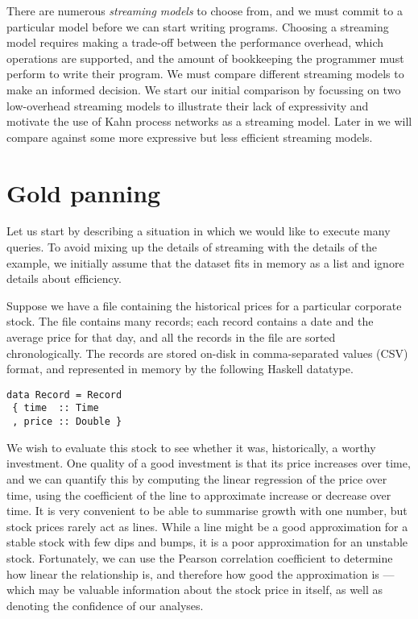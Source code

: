 There are numerous \emph{streaming models} to choose from, and we must commit to a particular model before we can start writing programs.
Choosing a streaming model requires making a trade-off between the performance overhead, which operations are supported, and the amount of bookkeeping the programmer must perform to write their program.
We must compare different streaming models to make an informed decision.
We start our initial comparison by focussing on two low-overhead streaming models to illustrate their lack of expressivity and motivate the use of Kahn process networks as a streaming model.
Later in  we will compare against some more expressive but less efficient streaming models.

\section{Gold panning}
Let us start by describing a situation in which we would like to execute many queries.
To avoid mixing up the details of streaming with the details of the example, we initially assume that the dataset fits in memory as a list and ignore details about efficiency.

Suppose we have a file containing the historical prices for a particular corporate stock.
The file contains many records; each record contains a date and the average price for that day, and all the records in the file are sorted chronologically.
The records are stored on-disk in comma-separated values (CSV) format, and represented in memory by the following Haskell datatype.

\begin{lstlisting}
data Record = Record
 { time  :: Time
 , price :: Double }
\end{lstlisting}

We wish to evaluate this stock to see whether it was, historically, a worthy investment.
One quality of a good investment is that its price increases over time, and we can quantify this by computing the linear regression of the price over time, using the coefficient of the line to approximate increase or decrease over time.
It is very convenient to be able to summarise growth with one number, but stock prices rarely act as lines.
While a line might be a good approximation for a stable stock with few dips and bumps, it is a poor approximation for an unstable stock.
Fortunately, we can use the Pearson correlation coefficient to determine how linear the relationship is, and therefore how good the approximation is --- which may be valuable information about the stock price in itself, as well as denoting the confidence of our analyses.

